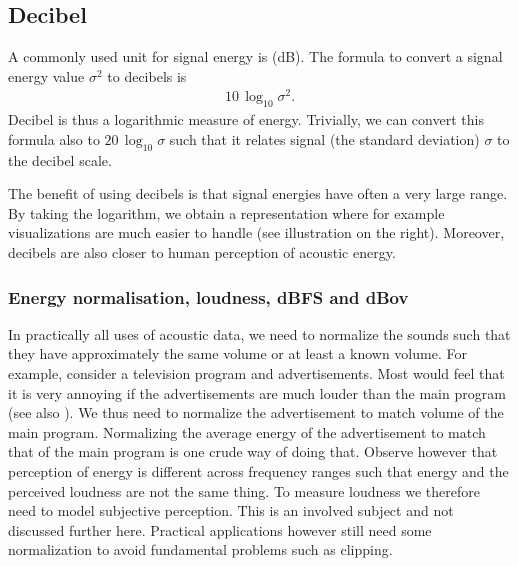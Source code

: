 \documentclass[letterpaper,10pt,english]{jupyterBook}
\begin{document}
\subsection{Decibel}
\label{\detokenize{Representations/Signal_energy_loudness_and_decibel:decibel}}
\sphinxAtStartPar
A commonly used unit for signal energy is
 (dB). The formula to
convert a signal energy value \( \sigma^2 \) to decibels is
\begin{equation*}
\begin{split} 10\,\log_{10}\sigma^2. \end{split}
\end{equation*}
\sphinxAtStartPar
Decibel is thus a logarithmic measure of energy. Trivially, we can
convert this formula also to \( 20\,\log_{10}\sigma \) such that
it relates signal  (the standard deviation) \( \sigma \)
to the decibel scale.

\sphinxAtStartPar
The benefit of using decibels is that signal energies have often a very
large range. By taking the logarithm, we obtain a representation where
for example visualizations are much easier to handle (see illustration
on the right). Moreover, decibels are also closer to human perception of
acoustic energy.


\subsubsection{Energy normalisation, loudness, dBFS and dBov}
\label{\detokenize{Representations/Signal_energy_loudness_and_decibel:energy-normalisation-loudness-dbfs-and-dbov}}
\sphinxAtStartPar
In practically all uses of acoustic data, we need to normalize the
sounds such that they have approximately the same volume or at least a
known volume. For example, consider a television program and
advertisements. Most would feel that it is very annoying if the
advertisements are much louder than the main program (see also ). We thus need to
normalize the advertisement to match volume of the main program.
Normalizing the average energy of the advertisement to match that of the
main program is one crude way of doing that. Observe however that
perception of energy is different across frequency ranges such that
energy and the perceived loudness are not the same thing. To measure
loudness we therefore need to model subjective perception. This is an
involved subject and not discussed further here. Practical applications
however still need some normalization to avoid fundamental problems such
as clipping.
\end{document}
